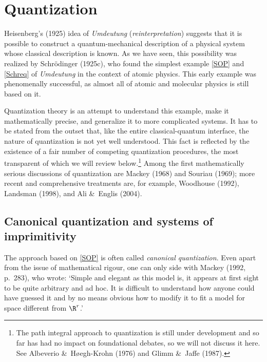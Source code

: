 \documentclass[12pt]{article}
\newcommand{\er}{\eqref}
\begin{document}
\section{Quantization}\label{S4}\setcounter{equation}{0}
Heisenberg's (1925) idea of {\it Umdeutung} ({\it reinterpretation}) suggests that it is possible to construct a quantum-mechanical description of a physical system whose classical description is known. As we have seen, this possibility was realized by Schr\"{o}dinger (1925c), who found the simplest example \er{SOP} and \er{Schreq} of {\it Umdeutung} in the context of atomic physics. This early example was phenomenally successful, as almost all of atomic and molecular physics is still based on it. 

Quantization theory is an attempt to understand this example, make it mathematically precise, and generalize it to more complicated systems. It has to be stated from the outset that, like the entire classical-quantum interface, the nature of quantization is not yet well understood. This fact is reflected by the existence of a fair number of competing quantization procedures,  the most transparent of which we will review below.\footnote{The path integral approach to quantization is still under development and so far has had no impact on foundational debates, so  we will not discuss it here.
See  Albeverio \&\ H\o egh-Krohn (1976) and Glimm \&\ Jaffe (1987).} Among  the first mathematically serious discussions of quantization are Mackey (1968) and  Souriau (1969); more recent and comprehensive treatments are, for example, Woodhouse (1992), Landsman (1998),  and Ali \&\ Englis (2004).
\subsection{Canonical quantization and systems of imprimitivity}\label{Mackey}
The approach based on \er{SOP} is often called {\it canonical quantization}. Even apart from the issue of mathematical rigour, one can only side with Mackey (1992, p.\ 283), who wrote: `Simple and elegant as this model is, it appears at first sight to be quite arbitrary and ad hoc. It is difficult to understand how anyone could have guessed it and by no means obvious how to modify it to fit a model for space different from $\R^r$.' 
\end{document}
